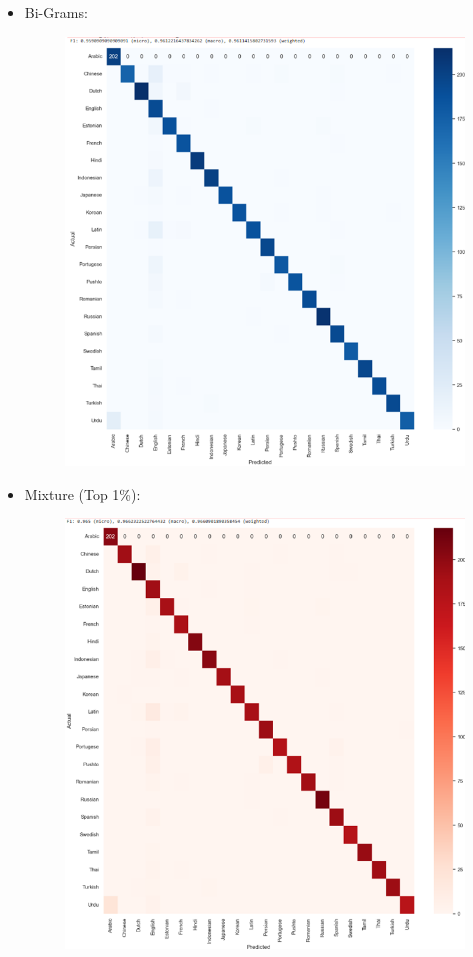 \begin{itemize}
\begin{itemize}
        \item Bi-Grams:
        \begin{figure}[H]
    \centering
    \includegraphics[width=1\textwidth]{img/docspics/Picture16.png}
\end{figure}
\clearpage
        \item Mixture (Top 1\%):
        \begin{figure}[H]
    \centering
    \includegraphics[width=1\textwidth]{img/docspics/Picture17.png}

\end{figure}
\end{itemize}
\end{itemize}
